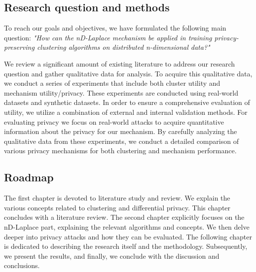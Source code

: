 \subsection*{Research question and methods}
To reach our goals and objectives, we have formulated the following main question: \newline \newline
\textit{"How can the nD-Laplace mechanism be applied in training privacy-preserving clustering algorithms on distributed n-dimensional data?"} \newline

We review a significant amount of existing literature to address our research question and gather qualitative data for analysis. 
To acquire this qualitative data, we conduct a series of experiments that include both cluster utility and mechanism utility/privacy. These experiments are conducted using real-world datasets and synthetic datasets.
In order to ensure a comprehensive evaluation of utility, we utilize a combination of external and internal validation methods. For evaluating privacy we focus on real-world attacks to acquire quantitative information about the privacy for our mechanism.
By carefully analyzing the qualitative data from these experiments, we conduct a detailed comparison of various privacy mechanisms for both clustering and mechanism performance.

\subsection*{Roadmap}
The first chapter is devoted to literature study and review.
We explain the various concepts related to clustering and differential privacy.
This chapter concludes with a literature review.
The second chapter explicitly focuses on the nD-Laplace part, explaining the relevant algorithms and concepts.
We then delve deeper into privacy attacks and how they can be evaluated. \newline
The following chapter is dedicated to describing the research itself and the methodology.
Subsequently, we present the results, and finally, we conclude with the discussion and conclusions.


